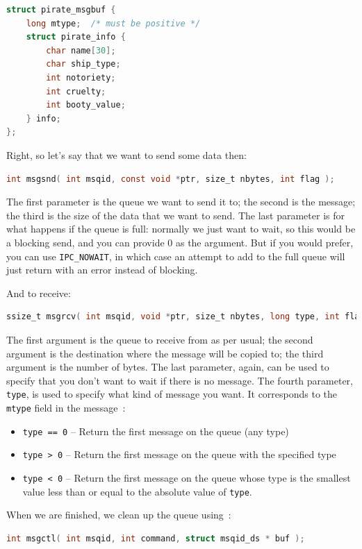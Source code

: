 \begin{lstlisting}[language=C]
struct pirate_msgbuf {
    long mtype;  /* must be positive */
    struct pirate_info {
        char name[30];
        char ship_type;
        int notoriety;
        int cruelty;
        int booty_value;
    } info;
};
\end{lstlisting}

Right, so let's say that we want to send some data then:

\begin{lstlisting}[language=C]
int msgsnd( int msqid, const void *ptr, size_t nbytes, int flag );
\end{lstlisting}

The first parameter is the queue we want to send it to; the second is the message; the third is the size of the data that we want to send. The last parameter is for what happens if the queue is full: normally we just want to wait, so this would be a blocking send, and you can provide 0 as the argument. But if you would prefer, you can use \texttt{IPC\_NOWAIT}, in which case an attempt to add to the full queue will just return with an error instead of blocking.

And to receive:
\begin{lstlisting}[language=C]
ssize_t msgrcv( int msqid, void *ptr, size_t nbytes, long type, int flag );
\end{lstlisting}

The first argument is the queue to receive from as per usual; the second argument is the destination where the message will be copied to; the third argument is the number of bytes. The last parameter, again, can be used to specify that you don't want to wait if there is no message. The fourth parameter, \texttt{type}, is used to specify what kind of message you want. It corresponds to the \texttt{mtype} field in the message~\cite{apunix}:

\begin{itemize}
	\item \texttt{type == 0} -- Return the first message on the queue (any type)
	\item \texttt{type > 0} -- Return the first message on the queue with the specified type
	\item \texttt{type < 0} -- Return the first message on the queue whose type is the smallest value less than or equal to the absolute value of \texttt{type}.
\end{itemize}

When we are finished, we clean up the queue using~\cite{apunix}:
\begin{lstlisting}[language=C]
int msgctl( int msqid, int command, struct msqid_ds * buf );
\end{lstlisting}


